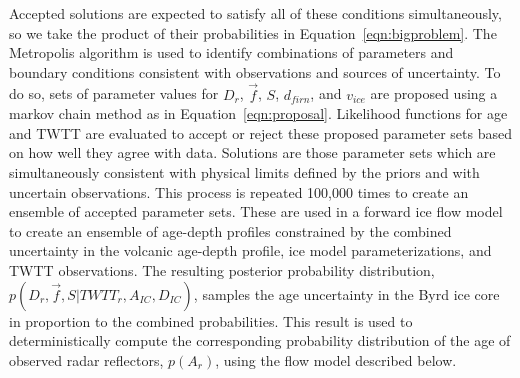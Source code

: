 Accepted solutions are expected to satisfy all of these conditions simultaneously, so we take the product of their probabilities in Equation~\ref{eqn:bigproblem}. The Metropolis algorithm is used to identify combinations of parameters and boundary conditions consistent with observations and sources of uncertainty. To do so, sets of parameter values for $D_r$, $\vec{f}$, $S$, $d_{firn}$, and $v_{ice}$ are proposed using a markov chain method as in Equation~\ref{eqn:proposal}. %
Likelihood functions for age and TWTT are evaluated to accept or reject these proposed parameter sets based on how well they agree with data. Solutions are those parameter sets which are simultaneously consistent with physical limits defined by the priors and with uncertain observations. This process is repeated 100,000 times to create an ensemble of accepted parameter sets. These are used in a forward ice flow model to create an ensemble of age-depth profiles constrained by the combined uncertainty in the volcanic age-depth profile, ice model parameterizations, and TWTT observations. The resulting posterior probability distribution, $p(D_r, \vec{f},S | TWTT_r, A_{IC}, D_{IC})$, samples the age uncertainty in the Byrd ice core in proportion to the combined probabilities. This result is used to deterministically compute the corresponding probability distribution of the age of observed radar reflectors, $p(A_r)$, using the flow model described below.



\label{radardepth}

%



